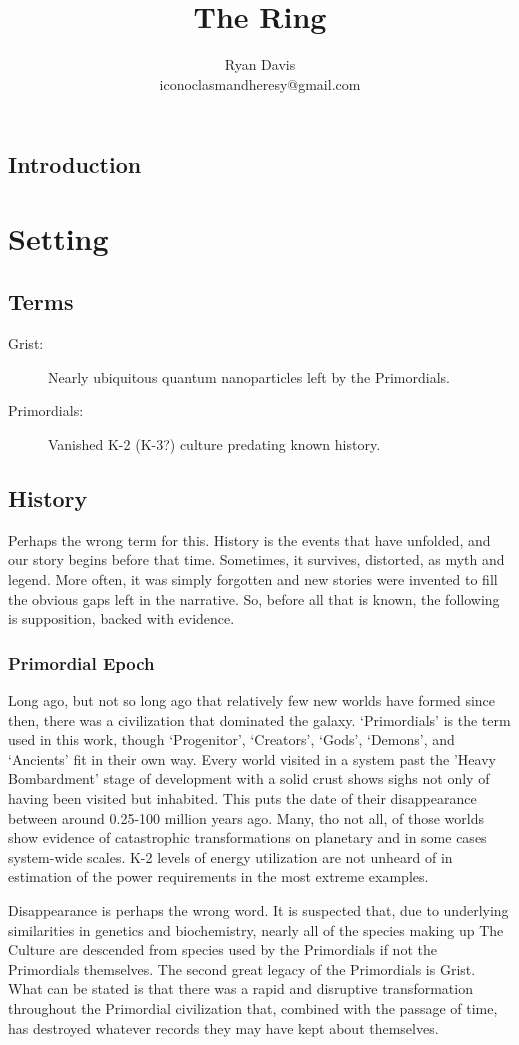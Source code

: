 \documentclass[letterpaper, 12pt]{report}
\title{The Ring}
\author{Ryan Davis\\iconoclasmandheresy@gmail.com}
\begin{document}
\maketitle
\tableofcontents
\section{Introduction}
\chapter{Setting}
\section{Terms}
\begin{description}
\item[Grist:] Nearly ubiquitous quantum nanoparticles left by the Primordials.
\item[Primordials:] Vanished K-2 (K-3?) culture predating known history.
\end{description}
\section{History}
Perhaps the wrong term for this.
History is the events that have unfolded, and our story begins before that time.
Sometimes, it survives, distorted, as myth and legend.
More often, it was simply forgotten and new stories were invented to fill the obvious gaps left in the narrative.
So, before all that is known, the following is supposition, backed with evidence.
\subsection{Primordial Epoch}
Long ago, but not so long ago that relatively few new worlds have formed since then, there was a civilization that dominated the galaxy.
`Primordials' is the term used in this work, though `Progenitor', `Creators', `Gods', `Demons', and `Ancients' fit in their own way.
Every world visited in a system past the 'Heavy Bombardment' stage of development with a solid crust shows sighs not only of having been visited but inhabited.
This puts the date of their disappearance between around 0.25-100 million years ago.
Many, tho not all, of those worlds show evidence of catastrophic transformations on planetary and in some cases system-wide scales.
K-2 levels of energy utilization are not unheard of in estimation of the power requirements in the most extreme examples.

Disappearance is perhaps the wrong word.
It is suspected that, due to underlying similarities in genetics and biochemistry, nearly all of the species making up The Culture are descended from species used by the Primordials if not the Primordials themselves.
The second great legacy of the Primordials is Grist. 
What can be stated is that there was a rapid and disruptive transformation throughout the Primordial civilization that, combined with the passage of time, has destroyed whatever records they may have kept about themselves.
\end{document}
